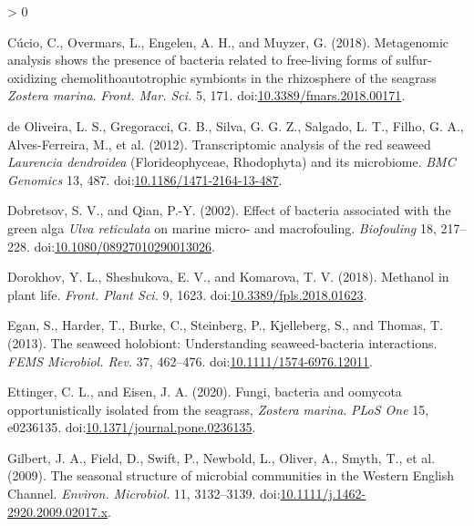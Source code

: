 \documentclass[
  12pt,
]{article}
\newlength{\cslhangindent}
\newenvironment{CSLReferences}[2] %
 {%
  \setlength{\parindent}{0pt}
  \ifodd #1 \everypar{\setlength{\hangindent}{\cslhangindent}}\ignorespaces\fi
  \ifnum #2 > 0
  \setlength{\parskip}{#2\baselineskip}
  \fi
 }%
 {}
\begin{document}
\begin{CSLReferences}{1}{0}
\leavevmode\hypertarget{ref-Cucio2018}{}%
Cúcio, C., Overmars, L., Engelen, A. H., and Muyzer, G. (2018).
Metagenomic analysis shows the presence of bacteria related to
free-living forms of sulfur-oxidizing chemolithoautotrophic symbionts in
the rhizosphere of the seagrass {\emph{Zostera marina}}. \emph{Front.
Mar. Sci.} 5, 171.
doi:\href{https://doi.org/10.3389/fmars.2018.00171}{10.3389/fmars.2018.00171}.

\leavevmode\hypertarget{ref-deOliveira2012}{}%
de Oliveira, L. S., Gregoracci, G. B., Silva, G. G. Z., Salgado, L. T.,
Filho, G. A., Alves-Ferreira, M., et al. (2012). Transcriptomic analysis
of the red seaweed {\emph{Laurencia dendroidea}} ({Florideophyceae},
{Rhodophyta}) and its microbiome. \emph{BMC Genomics} 13, 487.
doi:\href{https://doi.org/10.1186/1471-2164-13-487}{10.1186/1471-2164-13-487}.

\leavevmode\hypertarget{ref-Dobretsov2002}{}%
Dobretsov, S. V., and Qian, P.-Y. (2002). Effect of bacteria associated
with the green alga {\emph{Ulva reticulata}} on marine micro- and
macrofouling. \emph{Biofouling} 18, 217--228.
doi:\href{https://doi.org/10.1080/08927010290013026}{10.1080/08927010290013026}.

\leavevmode\hypertarget{ref-Dorokhov2018}{}%
Dorokhov, Y. L., Sheshukova, E. V., and Komarova, T. V. (2018). Methanol
in plant life. \emph{Front. Plant Sci.} 9, 1623.
doi:\href{https://doi.org/10.3389/fpls.2018.01623}{10.3389/fpls.2018.01623}.

\leavevmode\hypertarget{ref-Egan2013}{}%
Egan, S., Harder, T., Burke, C., Steinberg, P., Kjelleberg, S., and
Thomas, T. (2013). The seaweed holobiont: Understanding seaweed-bacteria
interactions. \emph{FEMS Microbiol. Rev.} 37, 462--476.
doi:\href{https://doi.org/10.1111/1574-6976.12011}{10.1111/1574-6976.12011}.

\leavevmode\hypertarget{ref-Ettinger2020}{}%
Ettinger, C. L., and Eisen, J. A. (2020). Fungi, bacteria and oomycota
opportunistically isolated from the seagrass, {\emph{Zostera marina}}.
\emph{PLoS One} 15, e0236135.
doi:\href{https://doi.org/10.1371/journal.pone.0236135}{10.1371/journal.pone.0236135}.

\leavevmode\hypertarget{ref-Gilbert2009}{}%
Gilbert, J. A., Field, D., Swift, P., Newbold, L., Oliver, A., Smyth,
T., et al. (2009). The seasonal structure of microbial communities in
the {Western English Channel}. \emph{Environ. Microbiol.} 11,
3132--3139.
doi:\href{https://doi.org/10.1111/j.1462-2920.2009.02017.x}{10.1111/j.1462-2920.2009.02017.x}.


\end{CSLReferences}
\end{document}
